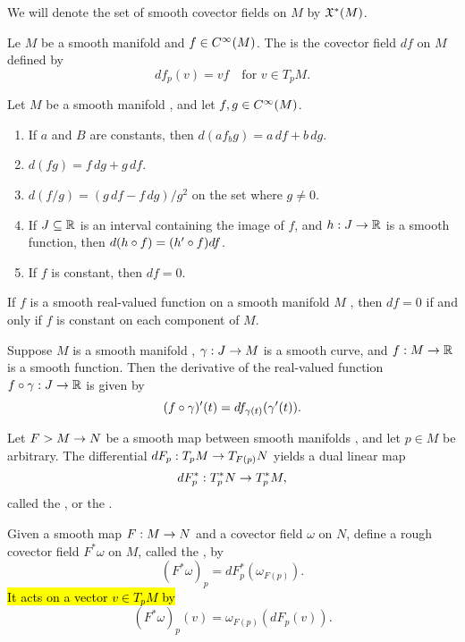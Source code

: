 \nb We will denote the set of smooth covector fields on $M$ by $\mathfrak{X}^*(M)$.

\dfn Le $M$ be a smooth manifold and $f\in C^\infty(M)$. The  is the covector field $df$ on $M$ defined by
\[df_p(v) = vf\quad\text{for } v\in T_pM.\]


\setcounter{thm}{19}

\begin{prop}
Let $M$ be a smooth manifold \wowob, and let $f,g\in C^\infty(M)$.
\begin{enumerate}
    \item If $a$ and $B$ are constants, then $d(af _ bg) = a\,df + b\,dg$.
    \item $d(fg) = f\,dg + g\,df$.
    \item $d(f/g) = (g\,df - f\,dg)/g^2$ on the set where $g\neq 0$.
    \item If $J\subseteq \mathbb{R}$ is an interval containing the image of $f$, and $h:J\rightarrow \mathbb{R}$ is a smooth function, then $d(h\circ f) = (h^\prime\circ f)df$.
    \item If $f$ is constant, then $df = 0$.
\end{enumerate}
\end{prop}

\setcounter{thm}{21}

\begin{prop}
If $f$ is a smooth real-valued function on a smooth manifold $M$ \wowob, then $df = 0$ if and only if $f$ is constant on each component of $M$.
\end{prop}

\begin{prop}
Suppose $M$ is a smooth manifold \wowob, $\gamma:J\rightarrow M$ is a smooth curve, and $f:M\rightarrow \mathbb{R}$ is a smooth function. Then the derivative of the real-valued function $f\circ\gamma:J\rightarrow \mathbb{R}$ is given by
\[(f\circ \gamma)^\prime(t)= df_{\gamma(t)} (\gamma^\prime(t)).\]
\end{prop}

\dfng Let $F>M\rightarrow N$ be a smooth map between smooth manifolds \wowob, and let $p\in M$ be arbitrary. The differential $dF_p:T_pM\rightarrow T_{F(p)}N$ yields a dual linear map
\[dF_p^*:T^*_pN\rightarrow T^*_pM,\]
called the , or the .

\dfn Given a smooth map $F:M\rightarrow N$ and a covector field $\omega$ on $N$, define a rough covector field $F^*\omega$ on $M$, called the , by 
\[(F^*\omega)_p = dF^*_p(\omega_{F(p)}).\]
\hl{It acts on a vector $v\in T_pM$ by}
\[(F^*\omega)_p(v) = \omega_{F(p)}(dF_p(v)).\]

